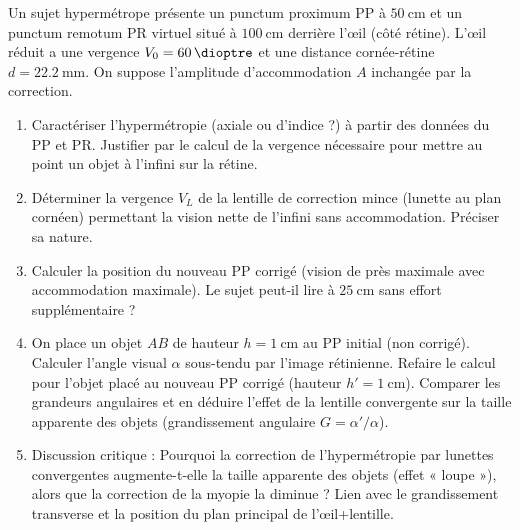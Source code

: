 \documentclass[11pt]{article}
\begin{document}
\begin{exercice}
Un sujet hypermétrope présente un punctum proximum PP à $\SI{50}{\centi\metre}$ et un punctum remotum PR virtuel situé à $\SI{100}{\centi\metre}$ derrière l'œil (côté rétine). L'œil réduit a une vergence $V_0 = \SI{60}{\dioptre}$ et une distance cornée-rétine $d = \SI{22,2}{\milli\metre}$. On suppose l'amplitude d'accommodation $A$ inchangée par la correction.
\begin{enumerate}
    \item Caractériser l'hypermétropie (axiale ou d'indice ?) à partir des données du PP et PR. Justifier par le calcul de la vergence nécessaire pour mettre au point un objet à l'infini sur la rétine.
    \item Déterminer la vergence $V_L$ de la lentille de correction mince (lunette au plan cornéen) permettant la vision nette de l'infini sans accommodation. Préciser sa nature.
    \item Calculer la position du nouveau PP corrigé (vision de près maximale avec accommodation maximale). Le sujet peut-il lire à $\SI{25}{\centi\metre}$ sans effort supplémentaire ?
    \item On place un objet $AB$ de hauteur $h = \SI{1}{\centi\metre}$ au PP initial (non corrigé). Calculer l'angle visual $\alpha$ sous-tendu par l'image rétinienne. Refaire le calcul pour l'objet placé au nouveau PP corrigé (hauteur $h' = \SI{1}{\centi\metre}$). Comparer les grandeurs angulaires et en déduire l'effet de la lentille convergente sur la taille apparente des objets (grandissement angulaire $G = \alpha'/\alpha$).
    \item Discussion critique : Pourquoi la correction de l'hypermétropie par lunettes convergentes augmente-t-elle la taille apparente des objets (effet « loupe »), alors que la correction de la myopie la diminue ? Lien avec le grandissement transverse et la position du plan principal de l'œil+lentille.
\end{enumerate}
\end{exercice}
\end{document}
